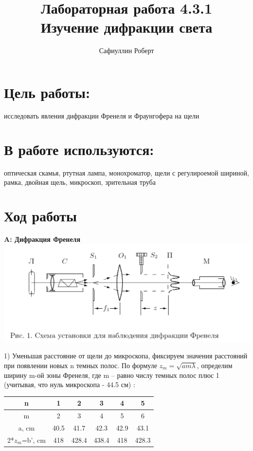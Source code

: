 \documentclass[a4paper,12pt]{article} %
\author{Сафиуллин Роберт	}
\title{Лабораторная работа  4.3.1\\ Изучение дифракции света}
\begin{document}

\maketitle


\newpage

\section{Цель работы:}
исследовать явления дифракции Френеля и Фраунгофера на щели
\\
\section{В работе используются:}
оптическая скамья, ртутная лампа, монохроматор, щели с регулироемой шириной, рамка, двойная щель, микроскоп, зрительная труба
 
        


\section{Ход работы}
\textbf{A: Дифракция Френеля} \\


\includegraphics[scale=0.5]{1}

 



 1) Уменьшая расстояние от щели до микроскопа, фиксируем значения расстояний при
появлении новых n темных полос. По формуле $z_m=\sqrt{am\lambda}$, определим ширину m-ой зоны Френеля,
где m – равно числу темных полос плюс 1  (учитывая, что нуль микроскопа - 44.5 см) :
\begin{tabular}{|c|c|c|c|c|c|}
\hline 
n & 1 & 2 & 3 & 4 & 5 \\ 
\hline 
m & 2 & 3 & 4 & 5 & 6 \\ 
\hline 
a, cm & 40.5 & 41.7 & 42.3 & 42.9 & 43.1 \\ 
\hline 
2*$z_m$=b', cm & 418	 & 428.4 & 438.4 & 418& 428.3 \\ 
\hline 
\end{tabular} 
 
\end{document}
